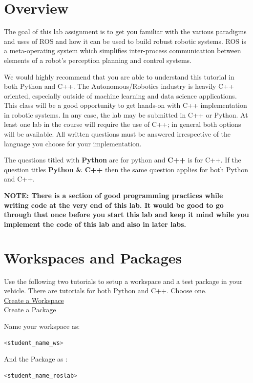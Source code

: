 \documentclass[letta4 paper]{article}
\numberwithin{equation}{section}
\newcommand{\0}{\mathbf{0}}
\begin{document}
	\section{Overview}
	The goal of this lab assignment is to get you familiar with the various paradigms and uses of ROS and how it can be used to build robust robotic systems.
	ROS is a meta-operating system which simplifies inter-process communication between elements of a robot's perception planning and control systems.
	
	We would highly recommend that you are able to understand this tutorial in both Python and C++. The Autonomous/Robotics industry is heavily C++ oriented, especially outside of machine learning and data science applications. This class will be a good opportunity to get hands-on with C++ implementation in robotic systems. In any case, the lab may be submitted in C++ or Python. At least one lab in the course will require the use of C++; in general both options will be available. All written questions must be answered irrespective of the language you choose for your implementation. 
	
	The questions titled with \textbf{Python} are for python and \textbf{C++} is for C++.
	If the question titles \textbf{Python \& C++} then the same question applies for both Python and C++.
	
	
	\textbf{NOTE: There is a section of good programming practices while writing code at the very end of this lab. It would be good to go through that once before you start this lab and keep it mind while you implement the code of this lab and also in later labs.}


	\section{Workspaces and Packages}
	
	Use the following two tutorials to setup a workspace and a test package in your vehicle. There are tutorials for both Python and C++. Choose one.\\
	\href{http://wiki.ros.org/catkin/Tutorials/create_a_workspace}{ Create a Workspace}\\
	\href{http://wiki.ros.org/ROS/Tutorials/CreatingPackage}{ Create a Package}
	
	\noindent Name your workspace as:
	\begin{lstlisting}[language=bash]
	<student_name_ws>
	\end{lstlisting}
	And the Package as : 
	\begin{lstlisting}[language=bash]
	<student_name_roslab>
	\end{lstlisting}
	
\end{document}
